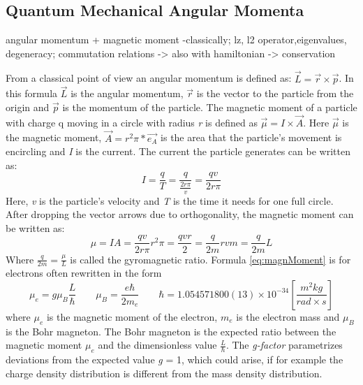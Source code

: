 \subsection{Quantum Mechanical Angular Momenta}
\label{sec:AngMom}

angular momentum + magnetic moment -classically; lz, l2 operator,eigenvalues, degeneracy; commutation relations -> also with hamiltonian -> conservation

From a classical point of view an angular momentum is defined as: $\vec{L} = \vec{r} \times \vec{p}$. In this formula $\vec{L}$ is the angular momentum, $\vec{r}$ is the vector to the particle from the origin and $\vec{p}$ is the momentum of the particle. The magnetic moment of a particle with charge q moving in a circle with radius \textit{r} is defined as $\vec{\mu} = I \times \vec{A}$. Here $\vec{\mu}$ is the magnetic moment, $\vec{A} = r^{2}\pi * \vec{e_{A}}$ is the area that the particle's movement is encircling and \textit{I} is the current. The current the particle generates can be written as:
\begin{equation}
 I = \frac{q}{T} = \frac{q}{\frac{2r\pi}{v}} = \frac{qv}{2r\pi}
\end{equation} 
Here, \textit{v} is the particle's velocity and \textit{T} is the time it needs for one full circle. After dropping the vector arrows due to orthogonality, the magnetic moment can be written as:
\begin{equation}
 \mu = IA = \frac{qv}{2r\pi}r^{2}\pi = \frac{qvr}{2} = \frac{q}{2m} rvm = \frac{q}{2m}L
 \label{eq:magnMoment}
\end{equation} 
Where $\frac{q}{2m} = \frac{\mu}{L}$ is called the gyromagnetic ratio. Formula \ref{eq:magnMoment} is for electrons often rewritten in the form
\begin{equation}
 \mu_{e} = g\mu_{B}\frac{L}{\hbar} \hspace{2em} \mu_{B} = \frac{e\hbar}{2m_{e}} \hspace{2em} \hbar = 1.054571800(13)\times10^{-34} [\frac{m^{2}kg}{rad\times s}]
 \label{eq:mue}
\end{equation} 
where $\mu_{e}$ is the magnetic moment of the electron, $m_{e}$ is the electron mass and $\mu_{B}$ is the Bohr magneton. The Bohr magneton is the expected ratio between the magnetic moment $\mu_{e}$ and the dimensionless value $\frac{L}{\hbar}$. The \textit{g-factor} parametrizes deviations from the expected value \textit{g} = 1, which could arise, if for example the charge density distribution is different from the mass density distribution.

